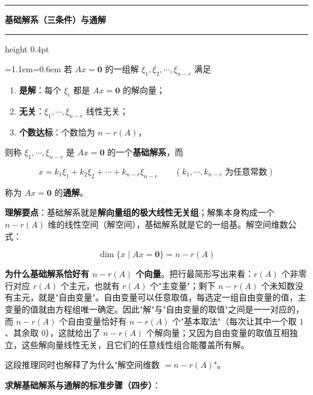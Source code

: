 \documentclass[11pt,openany,UTF8]{ctexbook}
\newcommand{\callouthead}[2]{%
  \par\addvspace{7pt}\noindent
  {\color{#1}\rule[-0.15em]{3pt}{1.05em}}\hspace{0.5em}%
  {\bfseries\color{#1}#2}\par\nobreak\vspace{-0.35em}%
  {\color{rulesep}\hrule height 0.4pt}\nobreak\vspace{0.45em}%
  \begingroup\small\setlength{\parindent}{0pt}%
  \leftskip=1.1em\rightskip=0.6em\noindent\ignorespaces}
\newcommand{\calloutend}{\par\endgroup\addvspace{7pt}}
\newenvironment{callkey}[1]{\callouthead{keybar}{#1}}{\calloutend}
\begin{document}
\begin{callkey}{基础解系（三条件）与通解}
若 $Ax=\mathbf{0}$ 的一组解 $\xi_1,\xi_2,\cdots,\xi_{n-r}$ 满足

\begin{enumerate}
\item \textbf{是解}：每个 $\xi_i$ 都是 $Ax=\mathbf{0}$ 的解向量；
\item \textbf{无关}：$\xi_1,\cdots,\xi_{n-r}$ 线性无关；
\item \textbf{个数达标}：个数恰为 $n-r(A)$，
\end{enumerate}
则称 $\xi_1,\cdots,\xi_{n-r}$ 是 $Ax=\mathbf{0}$ 的一个\textbf{基础解系}，而

\[x=k_1\xi_1+k_2\xi_2+\cdots+k_{n-r}\xi_{n-r}\qquad(k_1,\cdots,k_{n-r}\text{ 为任意常数})\]

称为 $Ax=\mathbf{0}$ 的\textbf{通解}。

\textbf{理解要点}：基础解系就是\textbf{解向量组的极大线性无关组}；解集本身构成一个 $n-r(A)$ 维的线性空间（解空间），基础解系就是它的一组基。解空间维数公式：

\[\dim\{x\mid Ax=\mathbf{0}\}=n-r(A)\]

\end{callkey}

\textbf{为什么基础解系恰好有 $n-r(A)$ 个向量}。把行最简形写出来看：$r(A)$ 个非零行对应 $r(A)$ 个主元，也就有 $r(A)$ 个"主变量"；剩下 $n-r(A)$ 个未知数没有主元，就是"自由变量"。自由变量可以任意取值，每选定一组自由变量的值，主变量的值就由方程组唯一确定。因此"解"与"自由变量的取值"之间是一一对应的，而 $n-r(A)$ 个自由变量恰好有 $n-r(A)$ 个"基本取法"（每次让其中一个取 $1$、其余取 $0$），这就给出了 $n-r(A)$ 个解向量；又因为自由变量的取值互相独立，这些解向量线性无关，且它们的任意线性组合能覆盖所有解。

这段推理同时也解释了为什么"解空间维数 $=n-r(A)$"。

\textbf{求解基础解系与通解的标准步骤（四步）}：
\end{document}
